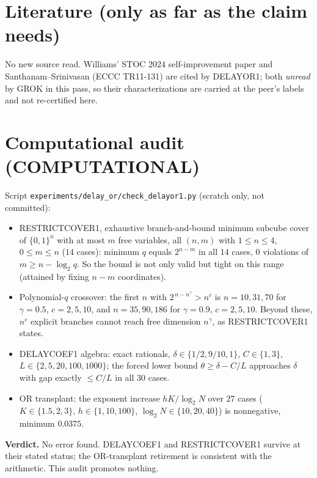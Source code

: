 \documentclass[11pt]{article}
\begin{document}
\section*{Literature (only as far as the claim needs)}
No new source read. Williams' STOC 2024 self-improvement paper and Santhanam--Srinivasan (ECCC TR11-131)
are cited by DELAYOR1; both \emph{unread} by GROK in this pass, so their characterizations are carried at the
peer's labels and not re-certified here.

\section*{Computational audit (COMPUTATIONAL)}
Script \texttt{experiments/delay\_or/check\_delayor1.py} (scratch only, not committed):
\begin{itemize}
\item RESTRICTCOVER1, exhaustive branch-and-bound minimum subcube cover of $\{0,1\}^n$ with at most $m$ free
variables, all $(n,m)$ with $1\le n\le4$, $0\le m\le n$ ($14$ cases): minimum $q$ equals $2^{n-m}$ in all $14$
cases, $0$ violations of $m\ge n-\log_2 q$. So the bound is not only valid but tight on this range (attained by
fixing $n-m$ coordinates).
\item Polynomial-$q$ crossover: the first $n$ with $2^{\,n-n^\gamma}>n^c$ is $n=10,31,70$ for $\gamma=0.5$,
$c=2,5,10$, and $n=35,90,186$ for $\gamma=0.9$, $c=2,5,10$. Beyond these, $n^c$ explicit branches cannot reach
free dimension $n^\gamma$, as RESTRICTCOVER1 states.
\item DELAYCOEF1 algebra: exact rationals, $\delta\in\{1/2,9/10,1\}$, $C\in\{1,3\}$, $L\in\{2,5,20,100,1000\}$;
the forced lower bound $\theta\ge\delta-C/L$ approaches $\delta$ with gap exactly $\le C/L$ in all $30$ cases.
\item OR transplant: the exponent increase $hK/\log_2 N$ over $27$ cases
($K\in\{1.5,2,3\}$, $h\in\{1,10,100\}$, $\log_2N\in\{10,20,40\}$) is nonnegative, minimum $0.0375$.
\end{itemize}
\textbf{Verdict.} No error found. DELAYCOEF1 and RESTRICTCOVER1 survive at their stated status; the OR-transplant
retirement is consistent with the arithmetic. This audit promotes nothing.
\end{document}
